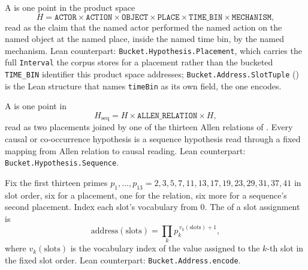 \documentclass[11pt]{article}
\begin{document}
\begin{definition}
\label{def:placement}
A  is one point in the
product space
\begin{equation}
  \label{eq:placement-space}
  H = \mathtt{ACTOR} \times \mathtt{ACTION} \times \mathtt{OBJECT}
    \times \mathtt{PLACE} \times \mathtt{TIME\_BIN} \times \mathtt{MECHANISM},
\end{equation}
read as the claim that the named actor performed the named action on the
named object at the named place, inside the named time bin, by the named
mechanism. Lean counterpart: \texttt{Bucket.Hypothesis.Placement}, which
carries the full \texttt{Interval} the corpus stores for a placement
rather than the bucketed \texttt{TIME\_BIN} identifier this product
space addresses; \texttt{Bucket.Address.SlotTuple}
() is the Lean structure that names
\texttt{timeBin} as its own field, the one  encodes.
\end{definition}

\begin{definition}
\label{def:sequence}
A  is one point in
\begin{equation}
  \label{eq:sequence-space}
  H_{\mathrm{seq}} = H \times \mathtt{ALLEN\_RELATION} \times H,
\end{equation}
read as two placements joined by one of the thirteen Allen relations of
. Every causal or co-occurrence hypothesis is a sequence
hypothesis read through a fixed mapping from Allen relation to causal
reading. Lean counterpart: \texttt{Bucket.Hypothesis.Sequence}.
\end{definition}

\begin{definition}[Address]
\label{def:address}
Fix the first thirteen primes $p_1, \ldots, p_{13} = 2, 3, 5, 7, 11, 13,
17, 19, 23, 29, 31, 37, 41$ in slot order, six for a placement, one for
the relation, six more for a sequence's second placement. Index each
slot's vocabulary from $0$. The  of a slot
assignment is
\begin{equation}
  \label{eq:address}
  \mathrm{address}(\mathrm{slots}) = \prod_{k} p_k^{\,v_k(\mathrm{slots}) + 1},
\end{equation}
where $v_k(\mathrm{slots})$ is the vocabulary index of the value assigned
to the $k$-th slot in the fixed slot order. Lean counterpart:
\texttt{Bucket.Address.encode}.
\end{definition}
\end{document}
